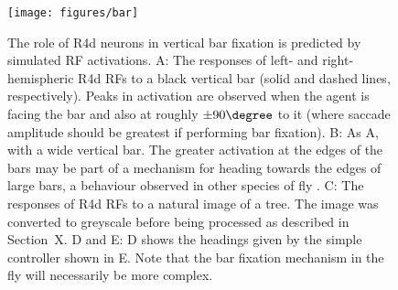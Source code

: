 \begin{figure}
\centering
\texttt{[image: figures/bar]}
\caption{The role of R4d neurons in vertical bar fixation is predicted by simulated \ac{RF} activations.
A: The responses of left- and right-hemispheric R4d \acp{RF} to a black vertical bar (solid and dashed lines, respectively). Peaks in activation are observed when the agent is facing the bar and also at roughly $\pm 90\degree$ to it (where saccade amplitude should be greatest if performing bar fixation).
B: As A, with a wide vertical bar. The greater activation at the edges of the bars may be part of a mechanism for heading towards the edges of large bars, a behaviour observed in other species of fly \protect\cite{Osorio1990}.
C: The responses of R4d \acp{RF} to a natural image of a tree. The image was converted to greyscale before being processed as described in Section~X.
D and E: D shows the headings given by the simple controller shown in E. Note that the bar fixation mechanism in the fly will necessarily be more complex.}

\label{fig:bar}
\end{figure}
